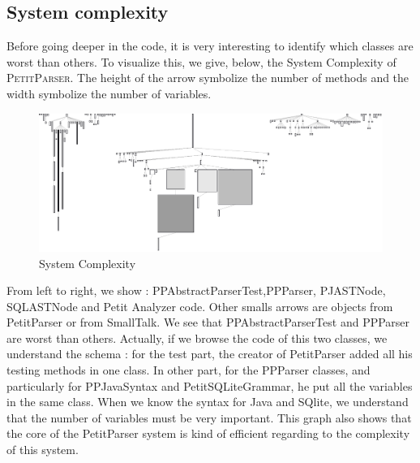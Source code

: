 \subsection{System complexity}
Before going deeper in the code, it is very interesting to identify which classes are worst than others.  To visualize this, we give, below, the System Complexity of \textsc{PetitParser}.
The height of the arrow symbolize the number of methods and the width symbolize the number of variables.
\begin{figure}[ht]
\label{system_complexity}
\includegraphics[scale=0.35]{system_complexity.png}
\caption{System Complexity}
\end{figure}
From left to right, we show : PPAbstractParserTest,PPParser, PJASTNode, SQLASTNode and Petit Analyzer code.  Other smalls arrows are objects from PetitParser or from SmallTalk.
We see that PPAbstractParserTest and PPParser are worst than others.  Actually, if we browse the code of this two classes, we understand the schema : for the test part, the creator of PetitParser added all his testing methods in one class.  In other part, for the PPParser classes, and particularly for PPJavaSyntax and PetitSQLiteGrammar, he put all the variables in the same class.  When we know the syntax for Java and SQlite, we understand that the number of variables must be very important.
This graph also shows that the core of the PetitParser system is kind of efficient regarding to the complexity of this system.
